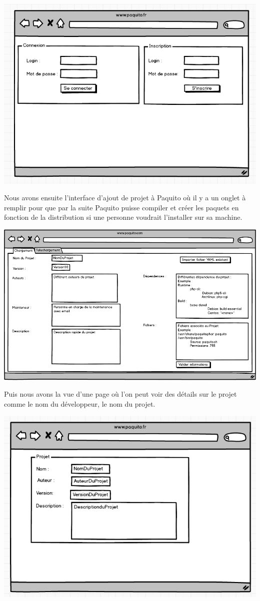 \documentclass[12pt,a4paper]{article}
\begin{document}
\includegraphics[scale=0.7]{../img/connexionPaquito.png}

Nous avons ensuite l'interface d'ajout de projet à Paquito où il y a un onglet à remplir pour que par la suite Paquito puisse compiler et créer les paquets en fonction de la distribution si une personne voudrait l'installer sur sa machine.

\includegraphics[scale=0.5]{../img/ajouterProjet.png}

Puis nous avons la vue d'une page où l'on peut voir des détails sur le projet comme le nom du développeur, le nom du projet.

\includegraphics[scale=0.6]{../img/resumeProjet.png}
\end{document}
